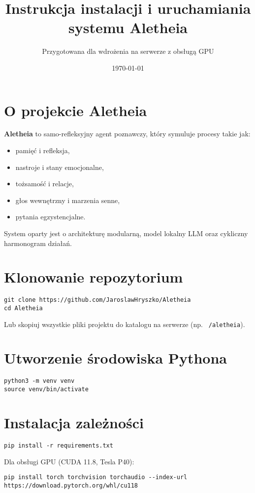 \documentclass[12pt]{article}
\title{\textbf{Instrukcja instalacji i uruchamiania systemu Aletheia}}
\author{Przygotowana dla wdrożenia na serwerze z obsługą GPU}
\date{\today}
\begin{document}
\maketitle

\section*{O projekcie Aletheia}
\textbf{Aletheia} to samo-refleksyjny agent poznawczy, który symuluje procesy takie jak:
\begin{itemize}
  \item pamięć i refleksja,
  \item nastroje i stany emocjonalne,
  \item tożsamość i relacje,
  \item głos wewnętrzny i marzenia senne,
  \item pytania egzystencjalne.
\end{itemize}

System oparty jest o architekturę modularną, model lokalny LLM oraz cykliczny harmonogram działań.

\section{Klonowanie repozytorium}
\begin{lstlisting}
git clone https://github.com/JaroslawHryszko/Aletheia
cd Aletheia
\end{lstlisting}

Lub skopiuj wszystkie pliki projektu do katalogu na serwerze (np. \texttt{~/aletheia}).

\section{Utworzenie środowiska Pythona}
\begin{lstlisting}
python3 -m venv venv
source venv/bin/activate
\end{lstlisting}

\section{Instalacja zależności}
\begin{lstlisting}
pip install -r requirements.txt
\end{lstlisting}

Dla obsługi GPU (CUDA 11.8, Tesla P40):
\begin{lstlisting}
pip install torch torchvision torchaudio --index-url https://download.pytorch.org/whl/cu118
\end{lstlisting}
\end{document}
